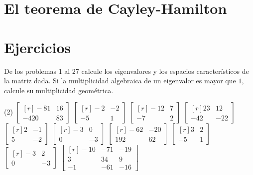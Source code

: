 \section{El teorema de Cayley-Hamilton}

\newpage

\section{Ejercicios}

\noindent
De los problemas 1 al 27 calcule los eigenvalores y los espacios característicos de la matriz dada. Si la multiplicidad algebraica de un eigenvalor es mayor que $1$, calcule su multiplicidad geométrica.
\begin{tasks}[
    style=enumerate,
    label-offset = 3mm,
    ](2)
    \task $\begin{bmatrix*}[r]-81 & 16 \\ -420 & 83\end{bmatrix*}$
    \task $\begin{bmatrix*}[r]-2 & -2 \\ -5 & 1\end{bmatrix*}$
    \task $\begin{bmatrix*}[r]-12 & 7 \\ -7 & 2\end{bmatrix*}$
    \task $\begin{bmatrix*}[r]23 & 12 \\ -42 & -22\end{bmatrix*}$
    \task $\begin{bmatrix*}[r]2 & -1 \\ 5 & -2\end{bmatrix*}$
    \task $\begin{bmatrix*}[r]-3 & 0 \\ 0 & -3\end{bmatrix*}$
    \task $\begin{bmatrix*}[r]-62 & -20 \\ 192 & 62\end{bmatrix*}$
    \task $\begin{bmatrix*}[r]3 & 2 \\ -5 & 1\end{bmatrix*}$
    \task $\begin{bmatrix*}[r]-3 & 2 \\ 0 & -3\end{bmatrix*}$
    \task $\begin{bmatrix*}[r]-10 & -71 & -19 \\ 3 & 34 & 9 \\ -1 & -61 & -16\end{bmatrix*}$

\end{tasks}

